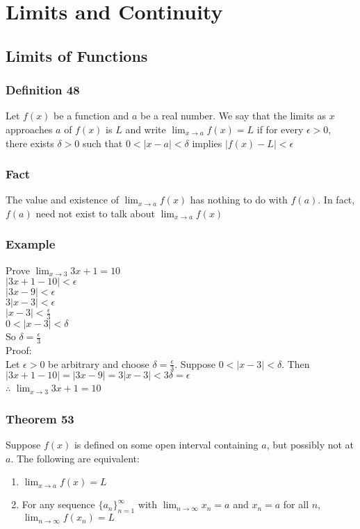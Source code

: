 \documentclass[12pt, letterpaper]{article}
\begin{document}
\section{Limits and Continuity}
\subsection{Limits of Functions}
\subsubsection*{Definition 48}
Let $f(x)$ be a function and $a$ be a real number. We say that the limits as $x$ approaches $a$ of $f(x)$ is
$L$ and write $\displaystyle\lim_{x\to a} f(x) = L$ if for every $\epsilon > 0$, there exists $\delta > 0$ such that 
$0 < |x-a| < \delta$ implies $|f(x) - L| < \epsilon$
\subsubsection*{Fact}
The value and existence of $\displaystyle\lim_{x\to a}f(x)$ has nothing to do with $f(a)$. In fact, 
$f(a)$ need not exist to talk about $\displaystyle\lim_{x\to a}f(x)$
\subsubsection*{Example}
Prove $\displaystyle\lim_{x\to 3} 3x+1 = 10$\\
$|3x+1-10| < \epsilon$ \\
$|3x-9| < \epsilon$ \\
$3|x-3| < \epsilon$ \\
$|x-3| < \frac{\epsilon}{3}$ \\
$0 < |x-3| < \delta$ \\
So $\delta = \frac{\epsilon}{3}$ \\
Proof: \\
Let $\epsilon > 0$ be arbitrary and choose $\delta = \frac{\epsilon}{3}$. Suppose $0 < |x-3| < \delta$. 
Then $|3x+1-10| = |3x-9| = 3|x-3| < 3\delta = \epsilon$ \\
$\therefore$ $\displaystyle\lim_{x\to 3} 3x+1 = 10$
\subsubsection*{Theorem 53}
Suppose $f(x)$ is defined on some open interval containing $a$, but possibly not at $a$. The following are equivalent: 
\begin{enumerate}
    \item $\displaystyle\lim_{x\to a} f(x) = L$
    \item For any sequence $\{a_n\}_{n=1}^\infty$ with $\displaystyle\lim_{n\to\infty} x_n = a$ and $x_n = a$ for all $n$, $\displaystyle\lim_{n\to\infty} f(x_n) = L$
\end{enumerate}
\end{document}
